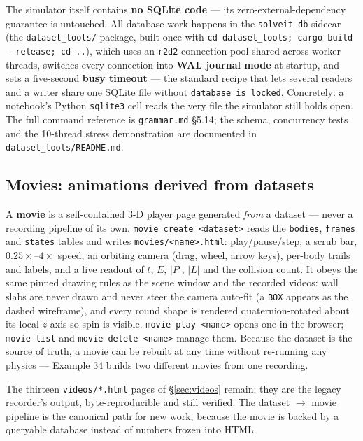 \documentclass[11pt]{article}
\newcommand{\kw}[1]{\texttt{\uppercase{#1}}}
\newcommand{\code}[1]{\texttt{#1}}
\begin{document}
The simulator itself contains \textbf{no SQLite code} --- its
zero-external-dependency guarantee is untouched. All database work
happens in the \code{solveit\_db} sidecar (the \code{dataset\_tools/}
package, built once with \code{cd dataset\_tools; cargo build
-{}-release; cd ..}), which uses an \code{r2d2} connection pool shared across
worker threads, switches every connection into \textbf{WAL journal
mode} at startup, and sets a five-second \textbf{busy timeout} --- the
standard recipe that lets several readers and a writer share one
SQLite file without \code{database is locked}. Concretely: a
notebook's Python \code{sqlite3} cell reads the very file the
simulator still holds open. The full command reference is
\code{grammar.md} \S5.14; the schema, concurrency tests and the
10-thread stress demonstration are documented in
\code{dataset\_tools/README.md}.

\subsection{Movies: animations derived from datasets}\label{sec:movies}

A \textbf{movie} is a self-contained 3-D player page generated
\emph{from} a dataset --- never a recording pipeline of its own.
\code{movie create <dataset>} reads the \code{bodies}, \code{frames}
and \code{states} tables and writes \code{movies/<name>.html}:
play/pause/step, a scrub bar, $0.25\times$--$4\times$ speed, an
orbiting camera (drag, wheel, arrow keys), per-body trails and labels,
and a live readout of $t$, $E$, $|P|$, $|L|$ and the collision count.
It obeys the same pinned drawing rules as the scene window and the
recorded videos: wall slabs are never drawn and never steer the camera
auto-fit (a \kw{box} appears as the dashed wireframe), and every round
shape is rendered quaternion-rotated about its local $z$ axis so spin
is visible. \code{movie play <name>} opens one in the browser;
\code{movie list} and \code{movie delete <name>} manage them. Because
the dataset is the source of truth, a movie can be rebuilt at any time
without re-running any physics --- Example 34 builds two different
movies from one recording.

The thirteen \code{videos/*.html} pages of \S\ref{sec:videos} remain:
they are the legacy recorder's output, byte-reproducible and still
verified. The dataset $\to$ movie pipeline is the canonical path for
new work, because the movie is backed by a queryable database instead
of numbers frozen into HTML.
\end{document}
